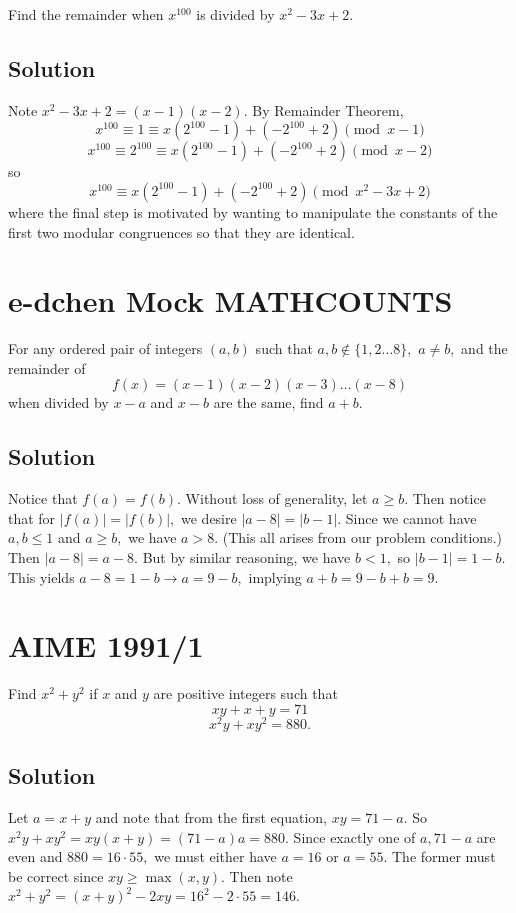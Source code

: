 \documentclass{article}
\begin{document}
Find the remainder when $x^{100}$ is divided by $x^2-3x+2.$

\subsection{Solution}

Note $x^2-3x+2=(x-1)(x-2).$ By Remainder Theorem, \[x^{100}\equiv 1\equiv x(2^{100}-1)+(-2^{100}+2)\pmod{x-1}\]
\[x^{100}\equiv 2^{100}\equiv x(2^{100}-1)+(-2^{100}+2)\pmod{x-2}\]
so
\[x^{100}\equiv x(2^{100}-1)+(-2^{100}+2)\pmod{x^2-3x+2}\]
where the final step is motivated by wanting to manipulate the constants of the first two modular congruences so that they are identical.

\pagebreak\section{e-dchen Mock MATHCOUNTS}

For any ordered pair of integers $(a,b)$ such that $a,b\not\in \{1,2\dots 8\},$ $a\neq b,$ and the remainder of $$f(x)=(x-1)(x-2)(x-3)\dots(x-8)$$ when divided by $x-a$ and $x-b$ are the same, find $a+b.$

\subsection{Solution}

Notice that $f(a)=f(b).$ Without loss of generality, let $a\geq b.$ Then notice that for $|f(a)|=|f(b)|,$ we desire $|a-8|=|b-1|.$ Since we cannot have $a,b\leq 1$ and $a\geq b,$ we have $a>8.$ (This all arises from our problem conditions.) Then $|a-8|=a-8.$ But by similar reasoning, we have $b<1,$ so $|b-1|=1-b.$ This yields $a-8=1-b\to a=9-b,$ implying $a+b=9-b+b=9.$

\pagebreak\section{AIME 1991/1}

Find $x^2+y^2$ if $x$ and $y$ are positive integers such that
\[xy+x+y = 71\]
\[x^2y+xy^2 = 880.\]

\subsection{Solution}

Let $a=x+y$ and note that from the first equation, $xy=71-a.$ So $x^2y+xy^2=xy(x+y)=(71-a)a=880.$ Since exactly one of $a,71-a$ are even and $880=16\cdot 55,$ we must either have $a=16$ or $a=55.$ The former must be correct since $xy\geq \max(x,y).$ Then note $x^2+y^2=(x+y)^2-2xy=16^2-2\cdot 55=146.$
\end{document}
